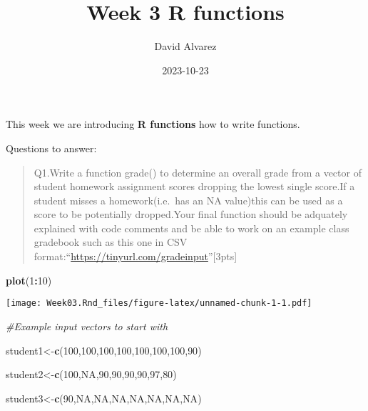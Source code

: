 \documentclass[
]{article}
\title{Week 3 R functions}
\author{David Alvarez}
\date{2023-10-23}
\newenvironment{Shaded}{\begin{snugshade}}{\end{snugshade}}
\newcommand{\CommentTok}[1]{\textcolor[rgb]{0.56,0.35,0.01}{\textit{#1}}}
\newcommand{\ConstantTok}[1]{\textcolor[rgb]{0.56,0.35,0.01}{#1}}
\newcommand{\DecValTok}[1]{\textcolor[rgb]{0.00,0.00,0.81}{#1}}
\newcommand{\FunctionTok}[1]{\textcolor[rgb]{0.13,0.29,0.53}{\textbf{#1}}}
\newcommand{\NormalTok}[1]{#1}
\newcommand{\OtherTok}[1]{\textcolor[rgb]{0.56,0.35,0.01}{#1}}
\newcommand{\SpecialCharTok}[1]{\textcolor[rgb]{0.81,0.36,0.00}{\textbf{#1}}}
\begin{document}
\maketitle

This week we are introducing \textbf{R functions} how to write
functions.

Questions to answer:

\begin{quote}
Q1.Write a function grade() to determine an overall grade from a vector
of student homework assignment scores dropping the lowest single
score.If a student misses a homework(i.e.~has an NA value)this can be
used as a score to be potentially dropped.Your final function should be
adquately explained with code comments and be able to work on an example
class gradebook such as this one in CSV
format:``\url{https://tinyurl.com/gradeinput}''{[}3pts{]}
\end{quote}

\begin{Shaded}
\begin{Highlighting}[]
\FunctionTok{plot}\NormalTok{(}\DecValTok{1}\SpecialCharTok{:}\DecValTok{10}\NormalTok{)}
\end{Highlighting}
\end{Shaded}

\texttt{[image: Week03.Rnd\_files/figure-latex/unnamed-chunk-1-1.pdf]}

\begin{Shaded}
\begin{Highlighting}[]
\CommentTok{\#Example input vectors to start with}

\NormalTok{student1}\OtherTok{\textless{}{-}}\FunctionTok{c}\NormalTok{(}\DecValTok{100}\NormalTok{,}\DecValTok{100}\NormalTok{,}\DecValTok{100}\NormalTok{,}\DecValTok{100}\NormalTok{,}\DecValTok{100}\NormalTok{,}\DecValTok{100}\NormalTok{,}\DecValTok{100}\NormalTok{,}\DecValTok{90}\NormalTok{)}

\NormalTok{student2}\OtherTok{\textless{}{-}}\FunctionTok{c}\NormalTok{(}\DecValTok{100}\NormalTok{,}\ConstantTok{NA}\NormalTok{,}\DecValTok{90}\NormalTok{,}\DecValTok{90}\NormalTok{,}\DecValTok{90}\NormalTok{,}\DecValTok{90}\NormalTok{,}\DecValTok{97}\NormalTok{,}\DecValTok{80}\NormalTok{)}

\NormalTok{student3}\OtherTok{\textless{}{-}}\FunctionTok{c}\NormalTok{(}\DecValTok{90}\NormalTok{,}\ConstantTok{NA}\NormalTok{,}\ConstantTok{NA}\NormalTok{,}\ConstantTok{NA}\NormalTok{,}\ConstantTok{NA}\NormalTok{,}\ConstantTok{NA}\NormalTok{,}\ConstantTok{NA}\NormalTok{,}\ConstantTok{NA}\NormalTok{)}
\end{Highlighting}
\end{Shaded}
\end{document}
